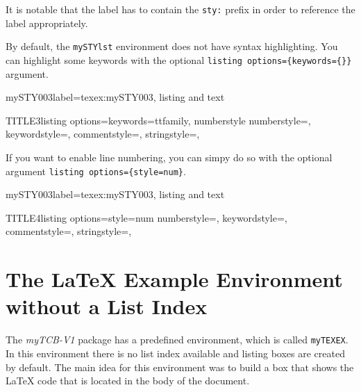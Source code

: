 \documentclass[]{myHOWTO-V001}
\begin{document}
It is notable that the label has to contain the \Verb|sty:| prefix in order to reference the label appropriately.

By default, the \Verb|mySTYlst| environment does not have syntax highlighting. You can highlight some keywords with the optional \verb|listing options={keywords={}}| argument.

\begin{myTEXEXdoclst}{mySTY003}{label={texex:mySTY003}, listing and text}
\begin{mySTYlst}{TITLE3}{listing options={keywords={ttfamily, numberstyle}}}
{
	numberstyle={\scriptsize\ttfamily},
	keywordstyle={\scriptsize\ttfamily},
	commentstyle={\scriptsize\ttfamily},
	stringstyle={\scriptsize\ttfamily},
}
\end{mySTYlst}
\end{myTEXEXdoclst}

If you want to enable line numbering, you can simpy do so with the optional argument \verb|listing options={style=num}|.

\begin{myTEXEXdoclst}{mySTY003}{label={texex:mySTY003}, listing and text}
\begin{mySTYlst}{TITLE4}{listing options={style=num}}
{
	numberstyle={\scriptsize\ttfamily},
	keywordstyle={\scriptsize\ttfamily},
	commentstyle={\scriptsize\ttfamily},
	stringstyle={\scriptsize\ttfamily},
}
\end{mySTYlst}
\end{myTEXEXdoclst}

%
%

\section{The \LaTeX{} Example Environment without a List Index}

The \emph{myTCB-V1} package has a predefined environment, which is called \Verb|myTEXEX|. In this environment there is no list index available and listing boxes are created by default. The main idea for this environment was to build a box that shows the \LaTeX{} code that is located in the body of the document.
\end{document}
